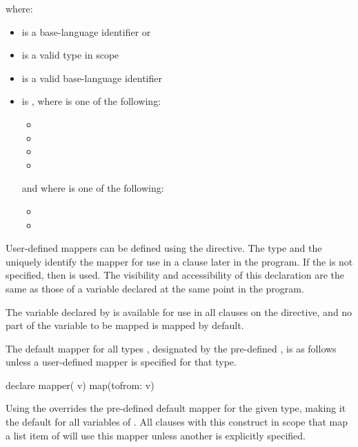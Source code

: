 where:

\begin{itemize}
\item {} is a base-language identifier or 
\item {} is a valid type in scope
\item {} is a valid base-language identifier
\item {} is \plc{[[map-type-modifier[}\pcode{,}\plc{] [map-type-modifier[}\pcode{,}\plc{] ...]] map-type}\pcode{:}\plc{ ] list}\pcode{)}
, where  is one of the following:

\begin{itemize}
\item {}
\item {}
\item {}
\item {}
\end{itemize}

and where  is one of the following:

\begin{itemize}
\item {}
\item {}
\end{itemize}
\end{itemize}

\descr
User-defined mappers can be defined using the  directive.
The type and the  uniquely identify the mapper for use in
a  clause later in the program.  If the  is not
specified, then  is used.  The visibility and accessibility of
this declaration are the same as those of a variable declared at the same point
in the program.

The variable declared by  is available for use in all 
clauses on the directive, and no part of the variable to be mapped is mapped by
default.

The default mapper for all types , designated by the pre-defined
 , is as follows unless a user-defined 
mapper is specified for that type.

\begin{ompSyntax}
declare mapper( v) map(tofrom: v)
\end{ompSyntax}

Using the   overrides the pre-defined
default mapper for the given type, making it the default for all
variables of . All  clauses with this construct in scope
that map a list item of  will use this mapper unless another is
explicitly specified.

